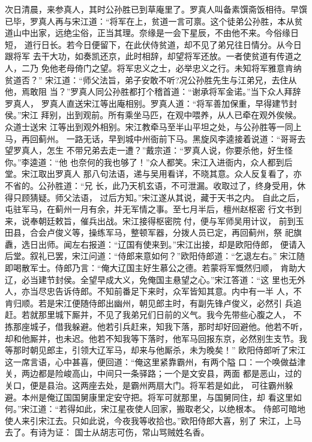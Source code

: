 次日清晨，来参真人，其时公孙胜已到草庵里了。罗真人叫备素馔斋饭相待。早馔
已毕，罗真人再与宋江道：“将军在上，贫道一言可禀。这个徒弟公孙胜，本从贫
道山中出家，远绝尘俗，正当其理。奈缘是一会下星辰，不由他不来。今俗缘日短，
道行日长。若今日便留下，在此伏侍贫道，却不见了弟兄往日情分。从今日跟将军
去干大功，如奏凯还京，此时相辞，却望将军还放。一者使贫道有传道之人，二乃
免他老母倚门之望。将军忠义之士，必举忠义之行。未知将军雅意肯纳贫道否？”
宋江道：“师父法旨，弟子安敢不听?况公孙胜先生与江弟兄，去住从他，焉敢阻
当？”罗真人同公孙胜都打个稽首道：“谢承将军金诺。”当下众人拜辞罗真人，
罗真人直送宋江等出庵相别。罗真人道：“将军善加保重，早得建节封侯。”宋江
拜别，出到观前。所有乘坐马匹，在观中喂养，从人已牵在观外俟候。众道士送宋
江等出到观外相别。宋江教牵马至半山平坦之处，与公孙胜等一同上马，再回蓟州。
一路无话，早到城中州衙前下马。黑旋风李逵接着说道：“哥哥去望罗真人，怎生
不带兄弟去走一遭？”戴宗道：“罗真人说，你要杀他，好生怪你。”李逵道：“他
也奈何的我也够了！”众人都笑。宋江入进衙内，众人都到后堂。宋江取出罗真人
那八句法语，递与吴用看详，不晓其意。众人反复看了，亦不省的。公孙胜道：“兄
长，此乃天机玄语，不可泄漏。收取过了，终身受用，休得只顾猜疑。师父法语，
过后方知。”宋江遂从其说，藏于天书之内。
自此之后，屯驻军马，在蓟州一月有余，并无军情之事。至七月半后，檀州赵枢密
行文书到来，说奉朝廷敕旨，催兵出战。宋江接得枢密院付，便与军师吴用计议，
前到玉田县，合会卢俊义等，操练军马，整顿军器，分拨人员已定，再回蓟州，祭
祀旗纛，选日出师。闻左右报道：“辽国有使来到。”宋江出接，却是欧阳侍郎，
便请入后堂。叙礼已罢，宋江问道：“侍郎来意如何？”欧阳侍郎道：“乞退左右。”
宋江随即喝散军士。侍郎乃言：“俺大辽国主好生慕公之德。若蒙将军慨然归顺，
肯助大辽，必当建节封侯。全望早成大义，免俺国主悬望之心。”宋江答道：“这
里也无外人，亦当尽忠告诉侍郎。不知前番足下来时，众军皆知其意。内中有一半
人，不肯归顺。若是宋江便随侍郎出幽州，朝见郎主时，有副先锋卢俊义，必然引
兵追赶。若就那里城下厮并，不见了我弟兄们日前的义气。我今先带些心腹之人，
不拣那座城子，借我躲避。他若引兵赶来，知我下落，那时却好回避他。他若不听，
却和他厮并，也未迟。他若不知我等下落时，他军马回报东京，必然别生支节。我
等那时朝见郎主，引领大辽军马，却来与他厮杀，未为晚矣！”
欧阳侍郎听了宋江这一席言语，心中甚喜，便回道：“俺这里紧靠霸州，有两个隘
口：一个唤做益津关，两边都是险峻高山，中间只一条驿路；一个是文安县，两面
都是恶山，过的关口，便是县治。这两座去处，是霸州两扇大门。将军若是如此，
可往霸州躲避。本州是俺辽国国舅康里定安守把。将军可就那里，与国舅同住，却
看这里如何。”宋江道：“若得如此，宋江星夜使人回家，搬取老父，以绝根本。
侍郎可暗地使人来引宋江去。只如此说，今夜我等收拾也。”欧阳侍郎大喜，别了
宋江，上马去了。有诗为证：
国士从胡志可伤，常山骂贼姓名香。
